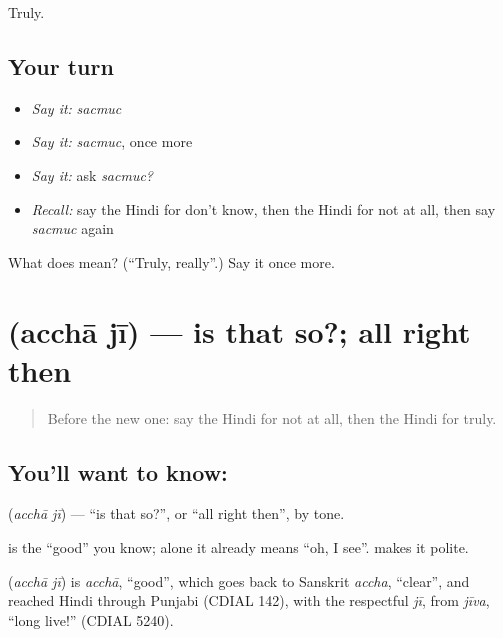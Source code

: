 \begin{grammarlens}[title={What you've built}]
Truly.
\end{grammarlens}

\subsection*{Your turn}
\begin{itemize}
\raggedright
  \item \emph{Say it:} \emph{sacmuc}
  \item \emph{Say it:} \emph{sacmuc}, once more
  \item \emph{Say it:} ask \emph{sacmuc?}
  \item \emph{Recall:} say the Hindi for don't know, then the Hindi for not at all, then say \emph{sacmuc} again
\end{itemize}

\begin{tcolorbox}[breakable,colback=teal!4,colframe=teal!35!black,title={Before you move on}]
What does  mean? (\textquotedblleft{}Truly, really\textquotedblright{}.) Say it once more.
\end{tcolorbox}
\section[\texorpdfstring{\hi{अच्छा} \hi{जी} (acchā jī)}{अच्छा जी (acchā jī)}]{  (acchā jī) — is that so?; all right then}

\label{lesson:HI-C127-achhaji}



\begin{quote}
Before the new one: say the Hindi for not at all, then the Hindi for truly.
\end{quote}

\subsection*{You'll want to know:  }
\textbf{ } (\emph{acchā jī}) — \textquotedblleft{}is that so?\textquotedblright{}, or \textquotedblleft{}all right then\textquotedblright{}, by tone.

\textbf{} is the \textquotedblleft{}good\textquotedblright{} you know; alone it already means \textquotedblleft{}oh, I see\textquotedblright{}. \textbf{} makes it polite.

\begin{cousinweb}
\textbf{ } (\emph{acchā jī}) is \emph{acchā}, \textquotedblleft{}good\textquotedblright{}, which goes back to Sanskrit \emph{accha}, \textquotedblleft{}clear\textquotedblright{}, and reached Hindi through Punjabi (CDIAL 142), with the respectful \emph{jī}, from \emph{jīva}, \textquotedblleft{}long live!\textquotedblright{} (CDIAL 5240).
\end{cousinweb}

